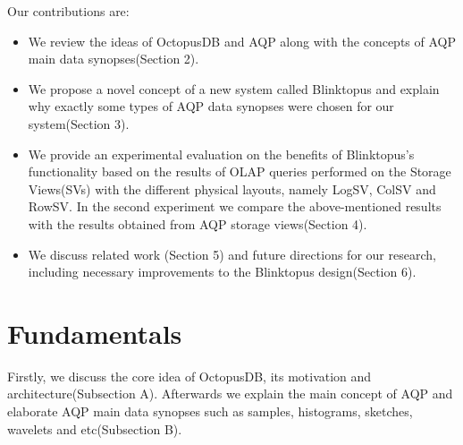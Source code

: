 \documentclass[10pt, conference, compsocconf]{IEEEtran}
\begin{document}
Our contributions are:
\begin{itemize}
\vspace{0.05 cm}
\item{We review the ideas of OctopusDB and AQP along with the concepts of AQP main data synopses(Section 2).}
\item{We propose a novel concept of a new system called Blinktopus and explain why exactly some types of AQP data synopses were chosen for our system(Section 3).}
\item{We provide an experimental evaluation on the benefits of Blinktopus's functionality based on the results of OLAP queries performed on the Storage Views(SVs) with the different physical layouts, namely LogSV, ColSV and RowSV. In the second experiment we compare the above-mentioned results with the results obtained from AQP storage views(Section 4).}
\item{We discuss related work (Section 5) and future directions for our research, including necessary improvements to the Blinktopus design(Section 6).}
\end{itemize}

\section{Fundamentals}
Firstly, we discuss the core idea of OctopusDB, its motivation and  architecture(Subsection A). Afterwards we explain the main concept of AQP and elaborate AQP main data synopses such as samples, histograms, sketches, wavelets and etc(Subsection B).
\end{document}

